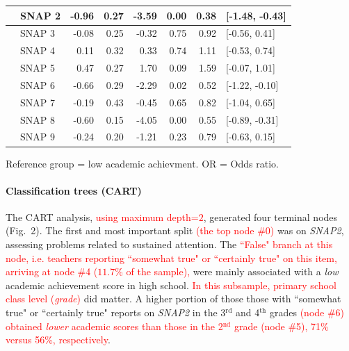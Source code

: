 \documentclass[10pt,letterpaper]{article}
\begin{document}
{{\begin{table}[H]
\begin{tabular}{|llrrrr|rl}
  \hline
  & SNAP 2 & -0.96 & 0.27 & -3.59 & 0.00 & 0.38 & [-1.48, -0.43] \\ 
  \hline
  & SNAP 3 & -0.08 & 0.25 & -0.32 & 0.75 & 0.92 & [-0.56, 0.41] \\ 
  \hline
  & SNAP 4 & 0.11 & 0.32 & 0.33 & 0.74 & 1.11 & [-0.53, 0.74] \\ 
  \hline
  & SNAP 5 & 0.47 & 0.27 & 1.70 & 0.09 & 1.59 & [-0.07, 1.01] \\ 
  \hline 
  & SNAP 6 & -0.66 & 0.29 & -2.29 & 0.02 & 0.52 & [-1.22, -0.10] \\ 
   \hline
  & SNAP 7 & -0.19 & 0.43 & -0.45 & 0.65 & 0.82 & [-1.04, 0.65] \\ 
  \hline
  & SNAP 8 & -0.60 & 0.15 & -4.05 & 0.00 & 0.55 & [-0.89, -0.31] \\ 
  \hline
  & SNAP 9 & -0.24 & 0.20 & -1.21 & 0.23 & 0.79 & [-0.63, 0.15] \\ 
   \hline

\end{tabular}
\begin{center}
Reference group = low academic achievment. OR = Odds ratio.\\ 
\end{center}
\end{table}
\vspace{5mm}


\paragraph{Classification trees (CART)}

 The CART analysis, \textcolor{red}{using  maximum depth=$2$},  generated four terminal nodes (Fig.~2). 
 The first and most important split \textcolor{red}{(the top node \#0)} was on {\it SNAP2}, 
 assessing problems related to sustained attention. The \textcolor{red}{``False" branch at this node, i.e. teachers reporting ``somewhat true" or ``certainly true" on this item, 
 arriving at node \#4  ($11.7$\% of the sample),} were 
 mainly associated with a {\it low} academic achievement score in high school. 
 \textcolor{red}{In this subsample, primary school class level ({\it grade})} did matter. 
 A higher portion of those those with ``somewhat true" or ``certainly true" 
 reports on {\it SNAP2} in the 3$^{\text{rd}}$ and 4$^{\text{th}}$ grades  \textcolor{red}{(node \#6) obtained {\it lower} academic scores than those in 
 the 2$^{\text{nd}}$ grade (node \#5), 71\% versus 56\%, respectively}. 

}}
\end{document}
